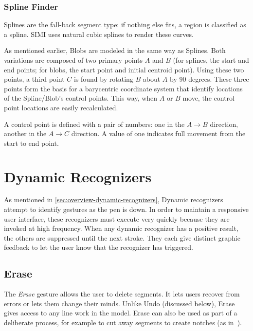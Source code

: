 \subsubsection{Spline Finder}

Splines are the fall-back segment type: if nothing else fits, a region
is classified as a spline. SIMI uses natural cubic splines to render
these curves.

As mentioned earlier, Blobs are modeled in the same way as
Splines. Both variations are composed of two primary points $A$ and
$B$ (for splines, the start and end points; for blobs, the start point
and initial centroid point). Using these two points, a third point $C$
is found by rotating $B$ about $A$ by 90 degrees. These three points
form the basis for a barycentric coordinate system that identify
locations of the Spline/Blob's control points. This way, when $A$ or
$B$ move, the control point locations are easily recalculated.

A control point is defined with a pair of numbers: one in the
$A\rightarrow B$ direction, another in the $A\rightarrow C$
direction. A value of one indicates full movement from the start to
end point.



\section{Dynamic Recognizers}

As mentioned in \ref{sec:overview-dynamic-recognizers}, Dynamic
recognizers attempt to identify gestures as the pen is down. In order
to maintain a responsive user interface, these recognizers must
execute very quickly because they are invoked at high frequency. When
any dynamic recognizer has a positive result, the others are
suppressed until the next stroke. They each give distinct graphic
feedback to let the user know that the recognizer has triggered.

\subsection{Erase}

The \textit{Erase} gesture allows the user to delete segments. It lets
users recover from errors or lets them change their minds. Unlike Undo
(discussed below), Erase gives access to any line work in the
model. Erase can also be used as part of a deliberate process, for
example to cut away segments to create notches (as
in~\cite{zeleznik-lineogrammer}).


